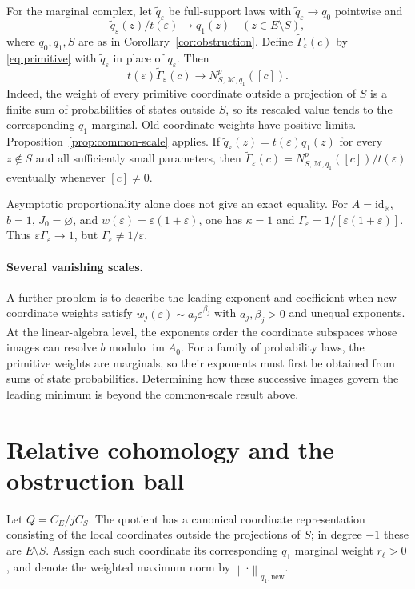 \documentclass[11pt,a4paper]{article}
\numberwithin{equation}{section}
\theoremstyle{remark}
\newcommand{\R}{\mathbb R}
\newcommand{\M}{\mathcal M}
\newcommand{\im}{\operatorname{im}}
\newcommand{\id}{\mathrm{id}}
\newcommand{\norm}[1]{\left\lVert #1\right\rVert}
\begin{document}
For the marginal complex, let $\widetilde q_\varepsilon$ be full-support laws with $\widetilde q_\varepsilon\to q_0$ pointwise and
\[
 \widetilde q_\varepsilon(z)/t(\varepsilon)\longrightarrow q_1(z)
 \quad(z\in E\setminus S),
\]
where $q_0,q_1,S$ are as in Corollary~\ref{cor:obstruction}. Define $\widetilde\Gamma_\varepsilon(c)$ by \eqref{eq:primitive} with $\widetilde q_\varepsilon$ in place of $q_\varepsilon$. Then
\begin{equation}\label{eq:nonaffine-marginal}
 t(\varepsilon)\widetilde\Gamma_\varepsilon(c)
 \longrightarrow N^p_{S,\M,q_1}([c]).
\end{equation}
Indeed, the weight of every primitive coordinate outside a projection of $S$ is a finite sum of probabilities of states outside $S$, so its rescaled value tends to the corresponding $q_1$ marginal. Old-coordinate weights have positive limits. Proposition~\ref{prop:common-scale} applies. If $\widetilde q_\varepsilon(z)=t(\varepsilon)q_1(z)$ for every $z\notin S$ and all sufficiently small parameters, then $\widetilde\Gamma_\varepsilon(c)=N^p_{S,\M,q_1}([c])/t(\varepsilon)$ eventually whenever $[c]\ne0$.

Asymptotic proportionality alone does not give an exact equality. For $A=\id_{\R}$, $b=1$, $J_0=\varnothing$, and $w(\varepsilon)=\varepsilon(1+\varepsilon)$, one has $\kappa=1$ and $\Gamma_\varepsilon=1/[\varepsilon(1+\varepsilon)]$. Thus $\varepsilon\Gamma_\varepsilon\to1$, but $\Gamma_\varepsilon\ne1/\varepsilon$.

\paragraph{Several vanishing scales.}
A further problem is to describe the leading exponent and coefficient when new-coordinate weights satisfy $w_j(\varepsilon)\sim a_j\varepsilon^{\beta_j}$ with $a_j,\beta_j>0$ and unequal exponents. At the linear-algebra level, the exponents order the coordinate subspaces whose images can resolve $b$ modulo $\im A_0$. For a family of probability laws, the primitive weights are marginals, so their exponents must first be obtained from sums of state probabilities. Determining how these successive images govern the leading minimum is beyond the common-scale result above.

\section{Relative cohomology and the obstruction ball}\label{sec:relative}
Let $Q=C_E/jC_S$. The quotient has a canonical coordinate representation consisting of the local coordinates outside the projections of $S$; in degree $-1$ these are $E\setminus S$. Assign each such coordinate its corresponding $q_1$ marginal weight $r_\ell>0$, and denote the weighted maximum norm by $\norm{\cdot}_{q_1,\mathrm{new}}$.
\end{document}
